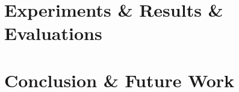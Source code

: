 \documentclass{article}
\begin{document}
\section{Experiments \& Results \& Evaluations}


\section{Conclusion \& Future Work}



%

%
%


\end{document}
